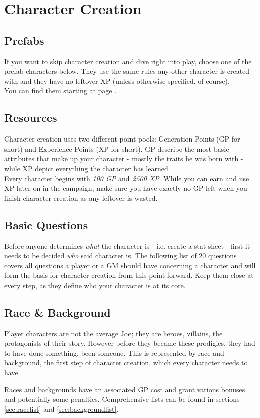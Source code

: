 \documentclass[12pt,a4paper,openany,dvipsnames]{book}
\begin{document}
	\chapter{Character Creation}
	\section{Prefabs}
	If you want to skip character creation and dive right into play, choose one of the prefab characters below.
	They use the same rules any other character is created with
		and they have no leftover XP (unless otherwise specified, of course).
	\\
	You can find them starting at page \pageref{sec:pfchars}.

	\section{Resources}
	\label{sec:ccResources}
	Character creation uses two different point pools:
		Generation Points (GP for short) and Experience Points (XP for short).
	GP describe the most basic attributes that make up your character - mostly the traits he was born with - while XP depict everything the character has learned.\\
	Every character begins with \emph{100 GP} and \emph{2500 XP}. While you can earn and use XP later on in the campaign, make sure you have exactly no GP left when you finish character creation as any leftover is wasted.

	\section{Basic Questions}
	Before anyone determines \emph{what} the character is - i.e. create a stat sheet - first it needs to be decided \emph{who} said character is. The following list of 20 questions covers all questions a player or a GM should have concerning a character and will form the basis for character creation from this point forward. Keep them close at every step, as they define who your character is at its core.

	\begin{multicols}{2}
	\begin{enumerate}
	\end{enumerate}
	\end{multicols}

	\section{Race \& Background}
	Player characters are not the average Joe; they are heroes, villains, the protagonists of their story. However before they became these prodigies, they had to have done something, been someone. This is represented by race and background, the first step of character creation, which every character needs to have.\par
	Races and backgrounds have an associated GP cost and grant various bonuses and potentially some penalties. Comprehensive lists can be found in sections \ref{sec:racelist} and \ref{sec:backgroundlist}.
\end{document}
